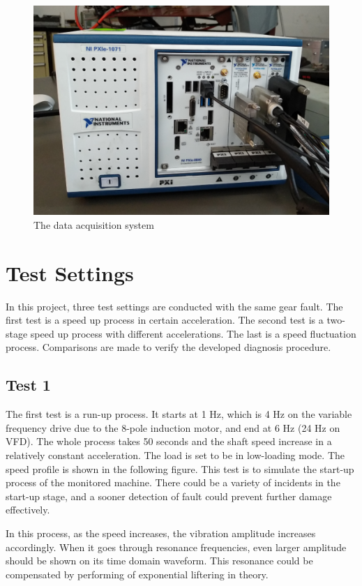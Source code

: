 \begin{figure}[h]
	\centering
	\includegraphics[scale = 0.4]{NI}
	\caption{The data acquisition system}
	\label{data acuisition}
\end{figure}

\section{Test Settings}

In this project, three test settings are conducted with the same gear fault. The first test is a speed up process in certain acceleration. The second test is a two-stage speed up process with different accelerations. The last is a speed fluctuation process. Comparisons are made to verify the developed diagnosis procedure.

\subsection{Test 1}

The first test is a run-up process. It starts at 1 Hz, which is 4 Hz on the variable frequency drive due to the 8-pole induction motor, and end at 6 Hz (24 Hz on VFD). The whole process takes 50 seconds and the shaft speed increase in a relatively constant acceleration. The load is set to be in low-loading mode. The speed profile is shown in the following figure. This test is to simulate the start-up process of the monitored machine. There could be a variety of incidents in the start-up stage, and a sooner detection of fault could prevent further damage effectively.

In this process, as the speed increases, the vibration amplitude increases accordingly. When it goes through resonance frequencies, even larger amplitude should be shown on its time domain waveform. This resonance could be compensated by performing of exponential liftering in theory.

